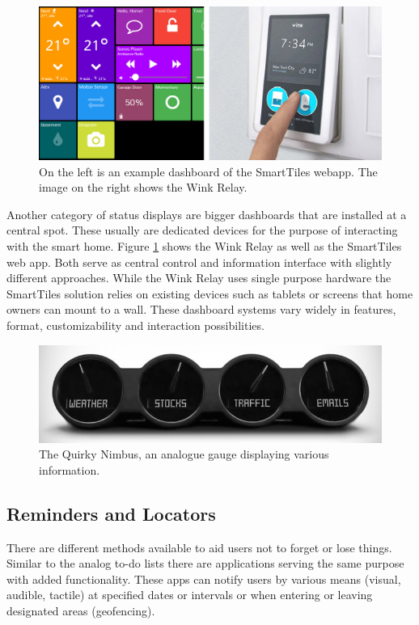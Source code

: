 \begin{figure}[ht]
\centering
	\includegraphics[keepaspectratio, width=6in]{Figures/Benchmarking/wink_smarttiles.jpg}
	\caption{On the left is an example dashboard of the SmartTiles webapp. The image on the right shows the Wink Relay.}
	\label{fig:wink_relay}
\end{figure}

Another category of status displays are bigger dashboards that are installed at a central spot. These usually are dedicated devices for the purpose of interacting with the smart home. Figure \ref{fig:wink_relay} shows the Wink Relay as well as the SmartTiles web app. Both serve as central control and information interface with slightly different approaches. While the Wink Relay uses single purpose hardware the SmartTiles solution relies on existing devices such as tablets or screens that home owners can mount to a wall. These dashboard systems vary widely in features, format, customizability and interaction possibilities.

\begin{figure}[ht]
\centering
	\includegraphics[keepaspectratio, width=5in]{Figures/Benchmarking/quirky_gauge.jpg}
	\caption{The Quirky Nimbus, an analogue gauge displaying various information.\protect\footnotemark}
	\label{fig:quirky_gauge}
\end{figure}


\subsection{Reminders and Locators} 
There are different methods available to aid users not to forget or lose things. Similar to the analog to-do lists there are applications serving the same purpose with added functionality. These apps can notify users by various means (visual, audible, tactile) at specified dates or intervals or when entering or leaving designated areas (geofencing). 

